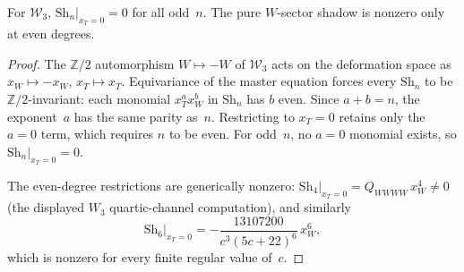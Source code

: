 \begin{corollary}
\label{cor:w-line-alternating-vanishing}%
%
For $\mathcal{W}_3$, $\mathrm{Sh}_n|_{x_T = 0} = 0$ for all
odd~$n$. The pure $W$-sector shadow is nonzero only at even degrees.
\end{corollary}

\begin{proof}
The $\mathbb{Z}/2$ automorphism $W \mapsto -W$ of $\mathcal{W}_3$
acts on the deformation space as $x_W \mapsto -x_W$, $x_T \mapsto
x_T$. Equivariance of the master equation forces every
$\mathrm{Sh}_n$ to be $\mathbb{Z}/2$-invariant: each
monomial $x_T^a x_W^b$ in $\mathrm{Sh}_n$ has $b$ even. Since
$a + b = n$, the exponent~$a$ has the same parity as~$n$.
Restricting to $x_T = 0$ retains only the $a = 0$ term, which
requires $n$ to be even. For odd~$n$, no $a = 0$ monomial exists,
so $\mathrm{Sh}_n|_{x_T = 0} = 0$.

The even-degree restrictions are generically nonzero:
$\mathrm{Sh}_4|_{x_T=0} = Q_{WWWW}\,x_W^4 \neq 0$
(the displayed $W_3$ quartic-channel computation), and similarly
\[
 \mathrm{Sh}_6\big|_{x_T=0}
 =-\frac{13107200}{c^3(5c+22)^6}\,x_W^6,
\]
which is nonzero for every finite regular value of~$c$.
\end{proof}


